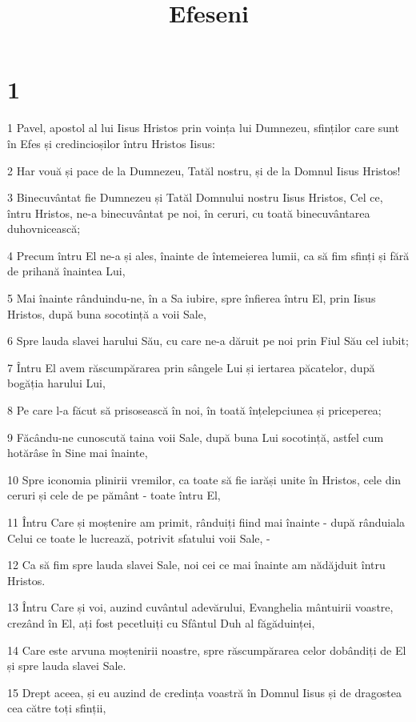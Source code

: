 

\title{Efeseni}


\chapter{1}

\par 1 Pavel, apostol al lui Iisus Hristos prin voința lui Dumnezeu, sfinților care sunt în Efes și credincioșilor întru Hristos Iisus:
\par 2 Har vouă și pace de la Dumnezeu, Tatăl nostru, și de la Domnul Iisus Hristos!
\par 3 Binecuvântat fie Dumnezeu și Tatăl Domnului nostru Iisus Hristos, Cel ce, întru Hristos, ne-a binecuvântat pe noi, în ceruri, cu toată binecuvântarea duhovnicească;
\par 4 Precum întru El ne-a și ales, înainte de întemeierea lumii, ca să fim sfinți și fără de prihană înaintea Lui,
\par 5 Mai înainte rânduindu-ne, în a Sa iubire, spre înfierea întru El, prin Iisus Hristos, după buna socotință a voii Sale,
\par 6 Spre lauda slavei harului Său, cu care ne-a dăruit pe noi prin Fiul Său cel iubit;
\par 7 Întru El avem răscumpărarea prin sângele Lui și iertarea păcatelor, după bogăția harului Lui,
\par 8 Pe care l-a făcut să prisosească în noi, în toată înțelepciunea și priceperea;
\par 9 Făcându-ne cunoscută taina voii Sale, după buna Lui socotință, astfel cum hotărâse în Sine mai înainte,
\par 10 Spre iconomia plinirii vremilor, ca toate să fie iarăși unite în Hristos, cele din ceruri și cele de pe pământ - toate întru El,
\par 11 Întru Care și moștenire am primit, rânduiți fiind mai înainte - după rânduiala Celui ce toate le lucrează, potrivit sfatului voii Sale, -
\par 12 Ca să fim spre lauda slavei Sale, noi cei ce mai înainte am nădăjduit întru Hristos.
\par 13 Întru Care și voi, auzind cuvântul adevărului, Evanghelia mântuirii voastre, crezând în El, ați fost pecetluiți cu Sfântul Duh al făgăduinței,
\par 14 Care este arvuna moștenirii noastre, spre răscumpărarea celor dobândiți de El și spre lauda slavei Sale.
\par 15 Drept aceea, și eu auzind de credința voastră în Domnul Iisus și de dragostea cea către toți sfinții,
